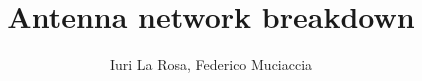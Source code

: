 

\newcommand{\myName}{Iuri La Rosa, Federico Muciaccia}                            %
\newcommand{\myTitle}{Antenna network breakdown}  %
\date{}                                                           %

\title{\myTitle}
\author{\myName}




\newcommand{\numberset}{\mathbb} 
\newcommand{\N}{\numberset{N}} 
\newcommand{\R}{\numberset{R}} 

\newenvironment{sistema}%
  {\left\lbrace\begin{array}{@{}l@{}}}%
  {\end{array}\right.}

\theoremstyle{definition} 
\newtheorem{definizione}{Definizione}

\theoremstyle{plain} 
\newtheorem{teorema}{Teorema}
\newtheorem{legge}{Legge}
\newtheorem{decreto}[legge]{Decreto}
\newtheorem{murphy}{Murphy}[section]






